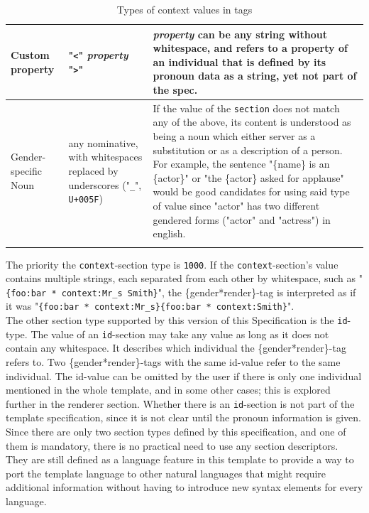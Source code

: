 \documentclass{article}
\begin{document}
\begin{flushleft}
\begin{center}
\begin{longtable}{| >{\raggedright\arraybackslash}p{7em} | >{\raggedright\arraybackslash}p{9em} | >{\raggedright\arraybackslash}p{14em} |}
                 \hline
                 \hline
                 Custom property & "\texttt{<}" \emph{property} "\texttt{>}" & \emph{property} can be any string without whitespace, and refers to a property of an individual that is defined by its pronoun data as a string, yet not part of the spec. \\
                 \hline
                 \hline
                 Gender-specific Noun & any nominative, with whitespaces replaced by underscores ("\texttt{\_}", \texttt{U+005F}) & If the value of the \texttt{section} does not match any of the above, its content is understood as being a noun which either server as a substitution or as a description of a person.
                 For example, the sentence "\{name\} is an \{actor\}" or "the \{actor\} asked for applause" would be good candidates for using said type of value since "actor" has two different gendered forms ("actor" and "actress") in english. \\
                 \hline
                \caption{Types of context values in tags}
            \end{longtable}
        \end{center}
    \end{flushleft}

    The priority the \texttt{context}-section type is \texttt{1000}.
    If the \texttt{context}-section's value contains multiple strings, each separated from each other by whitespace, such as "\texttt{\{foo:bar * context:Mr\_s Smith\}}", the \{gender*render\}-tag is interpreted as if it was "\texttt{\{foo:bar * context:Mr\_s\}\{foo:bar * context:Smith\}}". \\

    The other section type supported by this version of this Specification is the \texttt{id}-type.
    The value of an \texttt{id}-section may take any value as long as it does not contain any whitespace.
    It describes which individual the \{gender*render\}-tag refers to.
    Two \{gender*render\}-tags with the same id-value refer to the same individual.
    The id-value can be omitted by the user if there is only one individual mentioned in the whole template, and in some other cases;
    this is explored further in the renderer section.
    Whether there is an \texttt{id}-section is not part of the template specification, since it is not clear until the pronoun information is given.\\

    Since there are only two section types defined by this specification, and one of them is mandatory, there is no practical need to use any section descriptors.
    They are still defined as a language feature in this template to provide a way to port the template language to other natural languages that might require additional information without having to introduce new syntax elements for every language.\\
\end{document}
